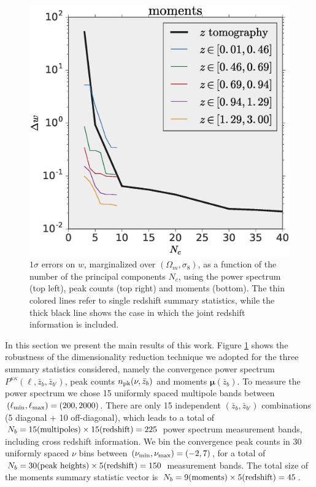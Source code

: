 \documentclass[reprint,aps,prd,superscriptaddress,showkeys,showpacs]{revtex4-1}
\begin{document}
\begin{figure}
\includegraphics[scale=0.3]{Figures/w_moments_pca.eps}
\caption{$1\sigma$ errors on $w$, marginalized over $(\Omega_m,\sigma_8)$, as a function of the number of the principal components $N_c$, using the power spectrum (top left), peak counts (top right) and moments (bottom). The thin colored lines refer to single redshift summary statistics, while the thick black line shows the case in which the joint redshift information is included.}
\label{fig:pcacomponents}
\end{figure}

In this section we present the main results of this work. Figure \ref{fig:pcacomponents} shows the robustness of the dimensionality reduction technique we adopted for the three summary statistics considered, namely the convergence power spectrum $P^{\kappa\kappa}(\ell,\bar{z}_b,\bar{z}_{b'})$, peak counts $n_{\rm pk}(\nu,\bar{z}_b)$ and moments $\pmb{\mu}(\bar{z}_b)$. To measure the power spectrum we chose 15 uniformly spaced multipole bands between $(\ell_{\rm min},\ell_{\rm max})=(200,2000)$. There are only 15 independent $(\bar{z}_b,\bar{z}_{b'})$ combinations (5 diagonal + 10 off-diagonal), which leads to a total of $N_b=15({\rm multipoles})\times 15({\rm redshift})=225$ power spectrum measurement bands, including cross redshift information. 
We bin the convergence peak counts in 30 uniformly spaced $\nu$ bins between $(\nu_{\rm min},\nu_{\rm max})=(-2,7)$, for a total of $N_b=30 (\rm peak \,\,heights)\times5({\rm redshift})=150$ measurement bands. The total size of the moments summary statistic vector is $N_b=9(\rm moments)\times 5(\rm redshift)=45$. 
\end{document}
